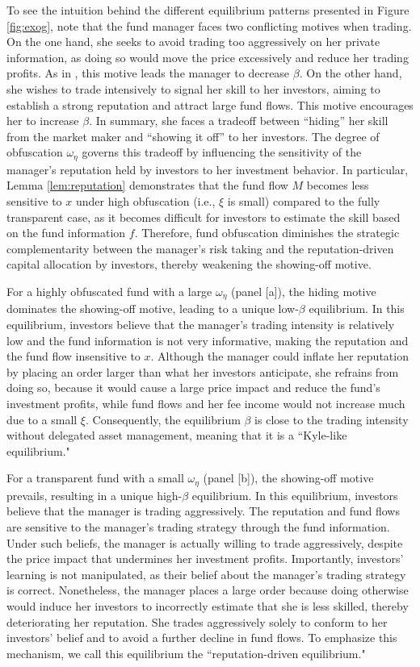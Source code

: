 To see the intuition behind the different equilibrium patterns presented in Figure \ref{fig:exog}, note that the fund manager faces two conflicting motives when trading. On the one hand, she seeks to avoid trading too aggressively on her private information, as doing so would move the price excessively and reduce her trading profits. As in \citet{kyle1985continuous}, this motive leads the manager to decrease $\beta$. On the other hand, she wishes to trade intensively to signal her skill to her investors, aiming to establish a strong reputation and attract large fund flows. This motive encourages her to increase $\beta$. In summary, she faces a tradeoff between ``hiding'' her skill from the market maker and ``showing it off'' to her investors. The degree of obfuscation $\omega_{\eta}$ governs this tradeoff by influencing the sensitivity of the manager's reputation held by investors to her investment behavior. In particular, Lemma \ref{lem:reputation} demonstrates that the fund flow $M$ becomes less sensitive to $x$ under high obfuscation (i.e., $\xi$ is small) compared to the fully transparent case, as it becomes difficult for investors to estimate the skill based on the fund information $f$. Therefore, fund obfuscation diminishes the strategic complementarity between the manager's risk taking and the reputation-driven capital allocation by investors, thereby weakening the showing-off motive.

For a highly obfuscated fund with a large $\omega_{\eta}$ (panel [a]), the hiding motive dominates the showing-off motive, leading to a unique low-$\beta$ equilibrium. In this equilibrium, investors believe that the manager's trading intensity is relatively low and the fund information is not very informative, making the reputation and the fund flow insensitive to $x$. Although the manager could inflate her reputation by placing an order larger than what her investors anticipate, she refrains from doing so, because it would cause a large price impact and reduce the fund's investment profits, while fund flows and her fee income would not increase much due to a small $\xi$. Consequently, the equilibrium $\beta$ is close to the trading intensity without delegated asset management, meaning that it is a ``Kyle-like equilibrium." 

For a transparent fund with a small $\omega_{\eta}$ (panel [b]), the showing-off motive prevails, resulting in a unique high-$\beta$ equilibrium. In this equilibrium, investors believe that the manager is trading aggressively. The reputation and fund flows are sensitive to the manager's trading strategy through the fund information. Under such beliefs, the manager is actually willing to trade aggressively, despite the price impact that undermines her investment profits. Importantly, investors' learning is not manipulated, as their belief about the manager's trading strategy is correct. Nonetheless, the manager places a large order because doing otherwise would induce her investors to incorrectly estimate that she is less skilled, thereby deteriorating her reputation. She trades aggressively solely to conform to her investors' belief and to avoid a further decline in fund flows. To emphasize this mechanism, we call this equilibrium the ``reputation-driven equilibrium."

